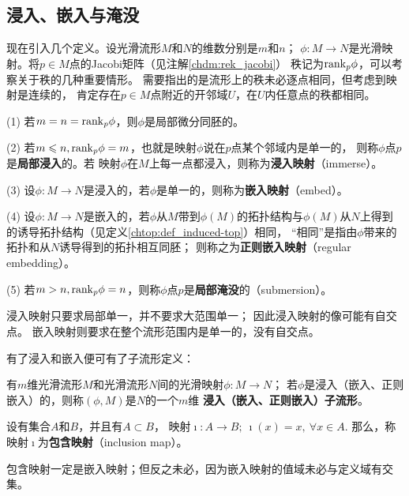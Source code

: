 \subsection{浸入、嵌入与淹没}\label{chdm:sec_immerse-embed}
现在引入几个定义。设光滑流形$M$和$N$的维数分别是$m$和$n$；
$\phi:M\to N$是光滑映射。将$p\in M$点的Jacobi矩阵（见注解\ref{chdm:rek_jacobi}）
秩记为${\rm rank}_p \phi$，可以考察关于秩的几种重要情形。
需要指出的是流形上的秩未必逐点相同，但考虑到映射是连续的，
肯定存在$p\in M$点附近的开邻域$U$，在$U$内任意点的秩都相同。

(1) 若$m=n={\rm rank}_p\phi$，则$\phi$是局部微分同胚的。

(2) 若$m\leqslant n, {\rm rank}_p\phi=m$，也就是映射$\phi$说在$p$点某个邻域内是单一的，
则称$\phi$点$p$是\textbf{局部浸入}的。若
映射$\phi$在$M$上每一点都浸入，则称为\textbf{浸入映射}（immerse）。

(3) 设$\phi:M\to N$是浸入的，若$\phi$是单一的，则称为\textbf{嵌入映射}（embed）。

(4) 设$\phi:M\to N$是嵌入的，若$\phi$从$M$带到$\phi(M)$的拓扑结构与$\phi(M)$从$N$上得到
的诱导拓扑结构（见定义\ref{chtop:def_induced-top}）相同，
“相同”是指由$\phi$带来的拓扑和从$N$诱导得到的拓扑相互同胚；
则称之为\textbf{正则嵌入映射}（regular embedding）。

(5) 若$m> n, {\rm rank}_p\phi=n$，则称$\phi$点$p$是\textbf{局部淹没}的（submersion）。


浸入映射只要求局部单一，并不要求大范围单一；
因此浸入映射的像可能有自交点。
嵌入映射则要求在整个流形范围内是单一的，没有自交点。


有了浸入和嵌入便可有了子流形定义：
\begin{definition}
    有$m$维光滑流形$M$和光滑流形$N$间的光滑映射$\phi:M\to N$；
    若$\phi$是浸入（嵌入、正则嵌入）的，则称$(\phi,M)$是$N$的一个$m$维
    \textbf{浸入（嵌入、正则嵌入）子流形}。
\end{definition}


\begin{definition}\label{chdm:def_inclusion-map}
    设有集合$A$和$B$，并且有$A\subset B$，
    映射$\imath: A\to B;\ \imath(x) = x, \ \forall x\in A. $
    那么，称映射$\imath$为\textbf{包含映射}（inclusion map）。
\end{definition}
包含映射一定是嵌入映射；但反之未必，因为嵌入映射的值域未必与定义域有交集。

